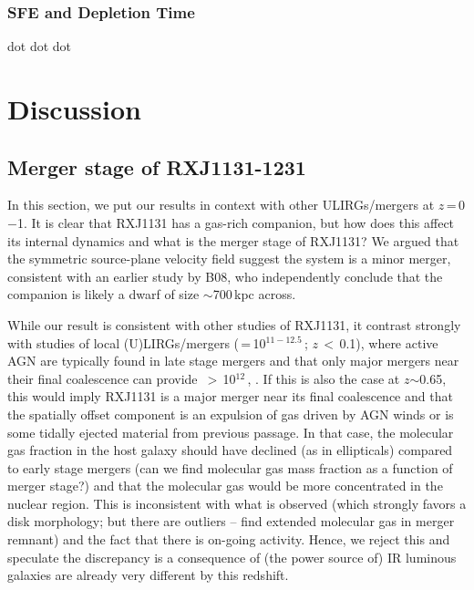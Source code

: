 \documentclass[]{emulateapj}
\begin{document}
\subsubsection{SFE and Depletion Time}
dot dot dot


\section{Discussion}
\subsection{Merger stage of RXJ1131-1231}
In this section, we put our results in context with other ULIRGs/mergers at
$z$\,=\,0$-$1. It is clear that RXJ1131 has a gas-rich companion, but how does
this affect its internal dynamics and what is the merger stage of RXJ1131?
We argued that the symmetric source-plane velocity field suggest
the system is a minor merger, consistent with an earlier study by B08, who
independently conclude that the companion is likely
a dwarf of size $\sim$700\,kpc across.

While our result is consistent with other studies of RXJ1131, it
contrast strongly with studies of local (U)LIRGs/mergers
(\LIR\,=\,10$^{11-12.5}$\,\Lsun; $z$\,$<$\,0.1), where active AGN are
typically found in late stage mergers
\citep{Yuan10a,Iwasawa11a,Carpineti12a} and
that only major mergers near their final
coalescence can provide \LIR\,$>$\,10$^{12}$\,\Lsun,
\citep[\eg][]{Carpineti15a,Larson16a}.
If this is also the case at $z$$\sim$0.65, this would imply RXJ1131
is a major merger near its final coalescence and that the spatially offset
component is an expulsion of gas driven by AGN winds or is some
tidally ejected material from previous passage.
In that case, the molecular gas fraction in the host
galaxy should have declined (as in ellipticals) compared to early
stage mergers (can we find molecular gas mass fraction as a
function of merger stage?) and that the molecular gas would
be more concentrated in the nuclear region.
This is inconsistent with what
is observed (which strongly favors a disk morphology;
but there are outliers --  \citet{Ueda14a} find
extended molecular gas in merger remnant) and
the fact that there is on-going \SF activity.
Hence, we reject this and speculate the discrepancy is a consequence
of (the power source of) IR luminous galaxies are already very different by this redshift.
\end{document}
